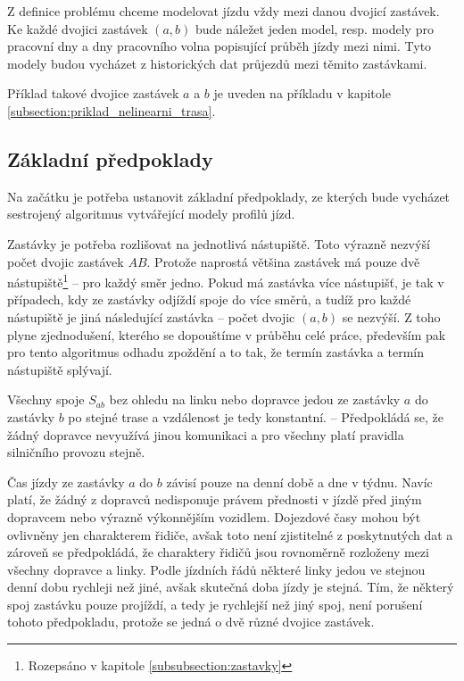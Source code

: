 Z definice problému chceme modelovat jízdu vždy mezi danou dvojicí zastávek. Ke každé dvojici zastávek $(a, b)$ bude náležet jeden model, resp. modely pro pracovní dny a dny pracovního volna popisující průběh jízdy mezi nimi. Tyto modely budou vycházet z historických dat průjezdů mezi těmito zastávkami.


\bigbreak


Příklad takové dvojice zastávek $a$ a $b$ je uveden na příkladu v kapitole \ref{subsection:priklad_nelinearni_trasa}.


\subsection{Základní předpoklady} \label{section:zakladni_predpoklady}


Na začátku je potřeba ustanovit základní předpoklady, ze kterých bude vycházet sestrojený algoritmus vytvářející modely profilů jízd.


\bigbreak


Zastávky je potřeba rozlišovat na jednotlivá nástupiště. Toto výrazně nezvýší počet dvojic zastávek $AB$. Protože naprostá většina zastávek má pouze dvě nástupiště\footnote{Rozepsáno v kapitole \ref{subsubsection:zastavky}} -- pro každý směr jedno. Pokud má zastávka více nástupišť, je tak v případech, kdy ze zastávky odjíždí spoje do více směrů, a tudíž pro každé nástupiště je jiná následující zastávka -- počet dvojic $(a, b)$ se nezvýší. Z toho plyne zjednodušení, kterého se dopouštíme v průběhu celé práce, především pak pro tento algoritmus odhadu zpoždění a to tak, že termín zastávka a termín nástupiště splývají.


\bigbreak


Všechny spoje $S_{ab}$ bez ohledu na linku nebo dopravce jedou ze zastávky $a$ do zastávky $b$ po stejné trase a vzdálenost je tedy konstantní. -- Předpokládá se, že žádný dopravce nevyužívá jinou komunikaci a pro všechny platí pravidla silničního provozu stejně.


\bigbreak


Čas jízdy ze zastávky $a$ do $b$ závisí pouze na denní době a dne v týdnu. Navíc platí, že žádný z dopravců nedisponuje právem přednosti v jízdě před jiným dopravcem nebo výrazně výkonnějším vozidlem.  Dojezdové časy mohou být ovlivněny jen charakterem řidiče, avšak toto není zjistitelné z poskytnutých dat a zároveň se předpokládá, že charaktery řidičů jsou rovnoměrně rozloženy mezi všechny dopravce a linky. Podle jízdních řádů některé linky jedou ve stejnou denní dobu rychleji než jiné, avšak skutečná doba jízdy je stejná. Tím, že některý spoj zastávku pouze projíždí, a tedy je rychlejší než jiný spoj, není porušení tohoto předpokladu, protože se jedná o dvě různé dvojice zastávek.


